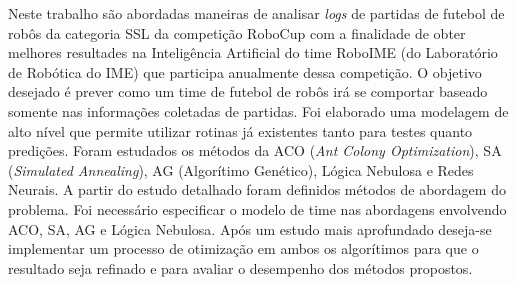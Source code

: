 \documentclass[
	12pt,				%
	oneside,			%
	a4paper,			%
	english,			%
	brazil,				%
	]{ime-abntex2}
\begin{document}

\setlength{\absparsep}{18pt} %
\begin{resumo}


Neste trabalho são abordadas maneiras de analisar \textit{logs} de partidas
de futebol de robôs
da categoria SSL da competição RoboCup com a finalidade de obter melhores resultades na
Inteligência Artificial do time RoboIME (do Laboratório de Robótica do IME) que
participa anualmente dessa competição.
O objetivo desejado é prever como um time de futebol de robôs irá se comportar baseado
somente nas informações coletadas de partidas.
Foi elaborado uma modelagem de alto nível que permite utilizar rotinas já existentes
tanto para testes quanto predições.
Foram estudados os métodos da ACO (\textit{Ant Colony Optimization}), SA
(\textit{Simulated Annealing}), AG (Algorítimo  Genético),
Lógica Nebulosa e Redes Neurais. A partir do estudo detalhado foram definidos métodos de
abordagem do problema. Foi necessário especificar o modelo de time nas abordagens
envolvendo ACO, SA, AG e Lógica Nebulosa.
Após um estudo mais aprofundado deseja-se implementar um processo de otimização em ambos
os algorítimos para que o resultado seja refinado e para avaliar o desempenho dos
métodos propostos.

%
\end{resumo}
\end{document}
